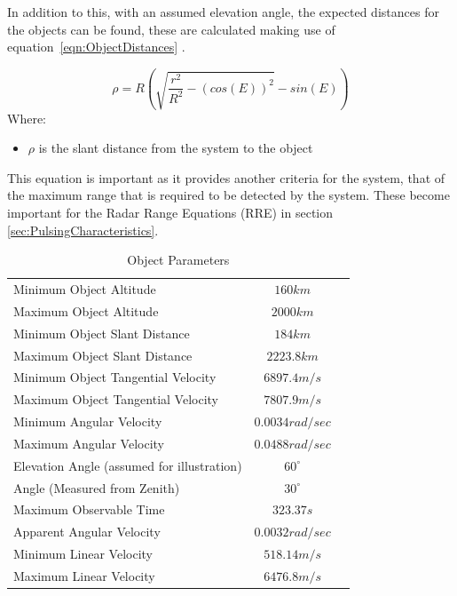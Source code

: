 \documentclass[11pt]{witseiepaper}
\begin{document}
In addition to this, with an assumed elevation angle, the expected distances for the objects can be found, these are calculated making use of equation~\ref{eqn:ObjectDistances} \cite{ObservableTime}.


\begin{equation} \label{eqn:ObjectDistances}
    \rho = R (\sqrt{\frac{r^2}{R^2} - (cos(E))^2} - sin(E))
    \end{equation}
Where:
\begin{itemize}
    \item $\rho$ is the slant distance from the system to the object
\end{itemize}
This equation is important as it provides another criteria for the system, that of the maximum range that is required to be detected by the system. These become important for the Radar Range Equations (RRE) in section \ref{sec:PulsingCharacteristics}.


\begin{table}
    \caption{Object Parameters}
    \label{tab:ObjectParameters}
    \begin{center}
        \begin{tabular}{p{70mm}cp{70mm}}
            \hline 
            Minimum Object Altitude & $160 km$ \\
            Maximum Object Altitude & $2000 km$ \\
            Minimum Object Slant Distance & $184 km$ \\
            Maximum Object Slant Distance & $2223.8 km$ \\            
            Minimum Object Tangential Velocity & $6897.4 m/s$ \\
            Maximum Object Tangential Velocity & $7807.9 m/s$ \\
            Minimum Angular Velocity & $0.0034 rad/sec$ \\
            Maximum Angular Velocity & $0.0488 rad/sec$ \\
            Elevation Angle (assumed for illustration) & $60^{\circ}$ \\
            Angle (Measured from Zenith) & $30^{\circ}$ \\
            Maximum Observable Time & $323.37 s$ \\
            Apparent Angular Velocity & $0.0032 rad/sec$ \\
            Minimum Linear Velocity & $518.14 m/s$ \\
            Maximum Linear Velocity & $6476.8 m/s$ \\
        \end{tabular}

    \end{center}
\end{table}
\end{document}
